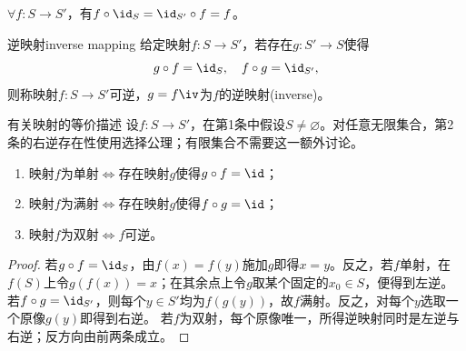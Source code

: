 \begin{corollary}
	$\forall f:S\to S'$，有$f\circ\id_S=\id_{S'}\circ f=f$。
\end{corollary}

\begin{definition}
	{逆映射}{inverse mapping}
	给定映射$f:S\to S'$，若存在$g:S'\to S$使得
	\[
		g\circ f=\id_S,\quad f\circ g=\id_{S'},
	\]
	则称映射$f:S\to S'$可逆，$g=f\iv$为$f$的逆映射(inverse)。
\end{definition}
\begin{theorem}{有关映射的等价描述}{}
	设$f:S\to S'$，在第1条中假设$S\neq\varnothing$。对任意无限集合，第2条的右逆存在性使用选择公理；有限集合不需要这一额外讨论。
	\begin{enumerate}
		\item 映射$f$为单射$\iff$存在映射$g$使得$g\circ f=\id$；
		\item 映射$f$为满射$\iff$存在映射$g$使得$f\circ g=\id$；
		\item 映射$f$为双射$\iff f$可逆。
	\end{enumerate}
\end{theorem}
\begin{proof}
    若$g\circ f=\id_S$，由$f(x)=f(y)$施加$g$即得$x=y$。反之，若$f$单射，在$f(S)$上令$g(f(x))=x$；在其余点上令$g$取某个固定的$x_0\in S$，便得到左逆。
    若$f\circ g=\id_{S'}$，则每个$y\in S'$均为$f(g(y))$，故$f$满射。反之，对每个$y$选取一个原像$g(y)$即得到右逆。
    若$f$为双射，每个原像唯一，所得逆映射同时是左逆与右逆；反方向由前两条成立。
	
\end{proof}
